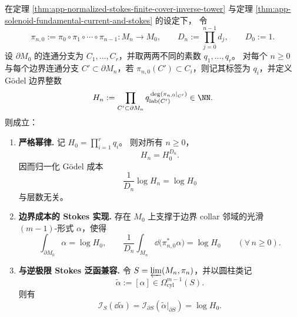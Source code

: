 \begin{theorem}\label{thm:app-covering-tower-godel-boundary-normalized-stokes}
在定理 \ref{thm:app-normalized-stokes-finite-cover-inverse-tower} 与定理 \ref{thm:app-solenoid-fundamental-current-and-stokes} 的设定下，
令
\[
\pi_{n,0}:=\pi_0\circ\pi_1\circ\cdots\circ\pi_{n-1}:M_n\to M_0,
\qquad
D_n:=\prod_{j=0}^{n-1}d_j,
\qquad
D_0:=1.
\]
设 \(\partial M_0\) 的连通分支为 \(C_1,\dots,C_r\)，并取两两不同的素数 \(q_1,\dots,q_r\)。
对每个 \(n\ge 0\) 与每个边界连通分支 \(C'\subset \partial M_n\)，若 \(\pi_{n,0}(C')\subset C_i\)，则记其标签为 \(q_i\)，并定义 Gödel 边界整数
\[
H_n
:=
\prod_{C'\subset\partial M_n}
q_{\mathrm{lab}(C')}^{\,\deg(\pi_{n,0}|_{C'})}
\in \NN.
\]
则成立：
\begin{enumerate}
  \item \textbf{严格幂律.}
        记 \(H_0=\prod_{i=1}^{r}q_i\)。
        则对所有 \(n\ge 0\)，
        \[
        H_n=H_0^{D_n}.
        \]
        因而归一化 Gödel 成本
        \[
        \frac{1}{D_n}\log H_n=\log H_0
        \]
        与层数无关。
  \item \textbf{边界成本的 Stokes 实现.}
        存在 \(M_0\) 上支撑于边界 collar 邻域的光滑 \((m-1)\)-形式 \(\alpha\)，使得
        \[
        \int_{\partial M_0}\alpha=\log H_0,
        \qquad
        \frac{1}{D_n}\int_{M_n}\dd\bigl(\pi_{n,0}^{\ast}\alpha\bigr)=\log H_0
        \qquad(\forall\, n\ge 0).
        \]
  \item \textbf{与逆极限 Stokes 泛函兼容.}
        令 \(S=\varprojlim(M_n,\pi_n)\)，并以圆柱类记
        \[
        \widetilde{\alpha}:=[\alpha]\in \Omega^{m-1}_{\mathrm{cyl}}(S).
        \]
        则有
        \[
        \mathcal I_S(\dd\widetilde{\alpha})
        =
        \mathcal I_{\partial S}(\widetilde{\alpha}|_{\partial S})
        =
        \log H_0.
        \]
\end{enumerate}
\end{theorem}

